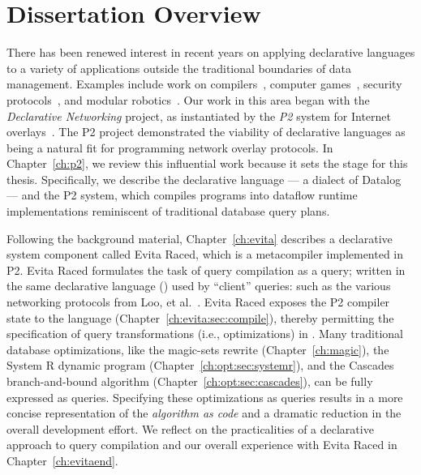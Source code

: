 \chapter[Dissertation Overview]{Dissertation Overview}
\label{ch:overview}

There has been renewed interest in recent years on applying declarative
languages to a variety of applications outside the traditional boundaries of
data management.  Examples include work on compilers~\cite{lam05context},
computer games~\cite{white-sigmod07}, security protocols~\cite{li-padl03}, and
modular robotics~\cite{ashley-iros07}.  Our work in this area began with the
{\em Declarative Networking} project, as instantiated by the {\em P2} system
for Internet overlays~\cite{p2:sosp, loo-sigmod06}.  The P2 project
demonstrated the viability of declarative languages as being a natural fit for
programming network overlay protocols.  In Chapter~\ref{ch:p2}, we review this
influential work because it sets the stage for this thesis.  Specifically, we
describe the declarative language \OVERLOG\@ --- a dialect of Datalog --- and
the P2 system, which compiles \OVERLOG programs into dataflow runtime
implementations reminiscent of traditional database query plans.

Following the background material, Chapter~\ref{ch:evita} describes a
declarative system component called Evita Raced, which is a metacompiler
implemented in P2.  Evita Raced formulates the task of query compilation as a
query; written in the same declarative language (\OVERLOG) used by ``client''
queries: such as the various networking protocols from Loo, et
al.~\cite{loo-sigmod06, p2:sosp}.  Evita Raced exposes the P2 compiler state to
the \OVERLOG language (Chapter~\ref{ch:evita:sec:compile}), thereby permitting
the specification of query transformations (i.e., optimizations) in \OVERLOG.
Many traditional database optimizations, like the magic-sets rewrite
(Chapter~\ref{ch:magic}), the System R dynamic program
(Chapter~\ref{ch:opt:sec:systemr}), and the Cascades branch-and-bound algorithm
(Chapter~\ref{ch:opt:sec:cascades}), can be fully expressed as \OVERLOG
queries.  Specifying these optimizations as \OVERLOG queries results in a more
concise representation of the {\em algorithm as code} and a dramatic reduction
in the overall development effort.  We reflect on the practicalities of a
declarative approach to query compilation and our overall experience with Evita
Raced in Chapter~\ref{ch:evitaend}.

